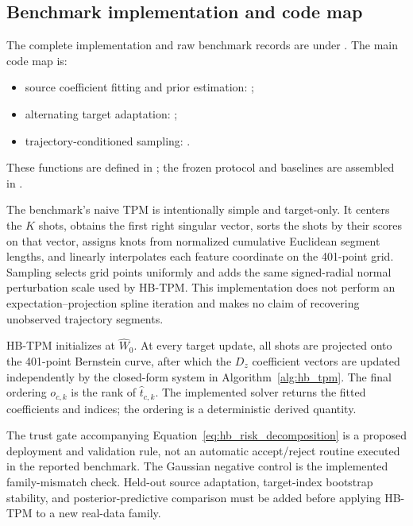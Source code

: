 \documentclass{article}
\begin{document}
\subsection{Benchmark implementation and code map}
The complete implementation and raw benchmark records are under . The main code map is:
\begin{itemize}
    \item source coefficient fitting and prior estimation: ;
    \item alternating target adaptation: ;
    \item trajectory-conditioned sampling: .
\end{itemize}
These functions are defined in ; the frozen protocol and baselines are assembled in .

The benchmark's naive TPM is intentionally simple and target-only. It centers the $K$ shots, obtains the first right singular vector, sorts the shots by their scores on that vector, assigns knots from normalized cumulative Euclidean segment lengths, and linearly interpolates each feature coordinate on the 401-point grid. Sampling selects grid points uniformly and adds the same signed-radial normal perturbation scale used by HB-TPM. This implementation does not perform an expectation--projection spline iteration and makes no claim of recovering unobserved trajectory segments.

HB-TPM initializes at $\widehat W_0$. At every target update, all shots are projected onto the 401-point Bernstein curve, after which the $D_z$ coefficient vectors are updated independently by the closed-form system in Algorithm~\ref{alg:hb_tpm}. The final ordering $o_{c,k}$ is the rank of $\widehat t_{c,k}$. The implemented solver returns the fitted coefficients and indices; the ordering is a deterministic derived quantity.

The trust gate accompanying Equation~\ref{eq:hb_risk_decomposition} is a proposed deployment and validation rule, not an automatic accept/reject routine executed in the reported benchmark. The Gaussian negative control is the implemented family-mismatch check. Held-out source adaptation, target-index bootstrap stability, and posterior-predictive comparison must be added before applying HB-TPM to a new real-data family.
\end{document}

